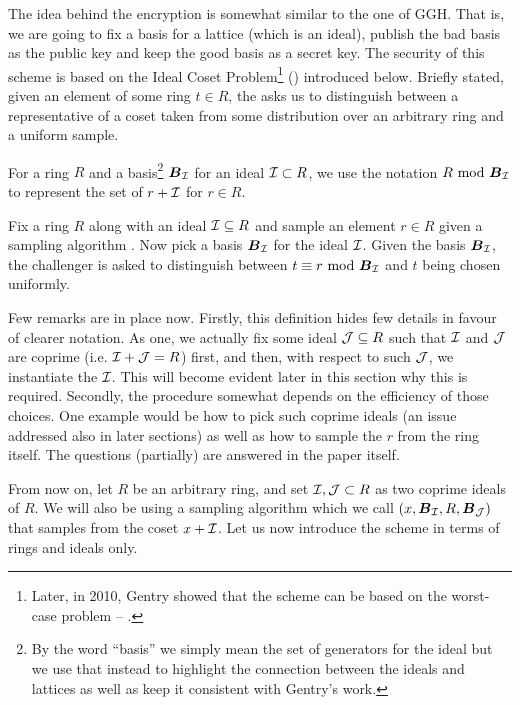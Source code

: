 The idea behind the encryption is somewhat similar to the one of GGH. That is, we are going to fix a basis for a lattice (which is an ideal), publish the bad basis as the public key and keep the good basis as a secret key. The security of this scheme is based on the Ideal Coset Problem\footnote{Later, in 2010, Gentry showed that the scheme can be based on the worst-case  problem -- \cite{worst-case}.} () introduced below. Briefly stated, given an element of some ring $t \in R$, the  asks us to distinguish between a representative of a coset taken from some distribution over an arbitrary ring and a uniform sample.

For a ring $R$ and a basis\footnote{By the word ``basis'' we simply mean the set of generators for the ideal but we use that instead to highlight the connection between the ideals and lattices as well as keep it consistent with Gentry's work.} $\boldsymbol{B}_{\mathcal{I}}$ for an ideal $\mathcal{I} \subset R$, we use the notation $R \text{ mod } \boldsymbol{B}_{\mathcal{I}}$ to represent the set of $r + \mathcal{I}$ for $r \in R$.

\begin{definition}
	Fix a ring $R$ along with an ideal $\mathcal{I} \subseteq R$ and sample an element $r \in R$ given a sampling algorithm . Now pick a basis $\boldsymbol{B}_{\mathcal{I}}$ for the ideal $\mathcal{I}$. Given the basis $\boldsymbol{B}_{\mathcal{I}}$, the challenger is asked to distinguish between $t \equiv r \text{ mod } \boldsymbol{B}_{\mathcal{I}}$ and $t$ being chosen uniformly.
\end{definition}
Few remarks are in place now. Firstly, this definition hides few details in favour of clearer notation. As one, we actually fix some ideal $\mathcal{J} \subseteq R$ such that $\mathcal{I}$ and $\mathcal{J}$ are coprime (i.e. $\mathcal{I} + \mathcal{J} = R$) first, and then, with respect to such $\mathcal{J}$, we instantiate the $\mathcal{I}$. This will become evident later in this section why this is required. Secondly, the procedure somewhat depends on the efficiency of those choices. One example would be how to pick such coprime ideals (an issue addressed also in later sections) as well as how to sample the $r$ from the ring itself. The questions (partially) are answered in the paper \cite{gentry_phd} itself.

From now on, let $R$ be an arbitrary ring, and set $\mathcal{I}, \mathcal{J} \subset R$ as two coprime ideals of $R$.  We will also be using a sampling algorithm which we call $(x, \boldsymbol{B}_{\mathcal{I}} , R, \boldsymbol{B}_{\mathcal{J}})$ that samples from the coset $x + \mathcal{I}$. Let us now introduce the scheme in terms of rings and ideals only.

